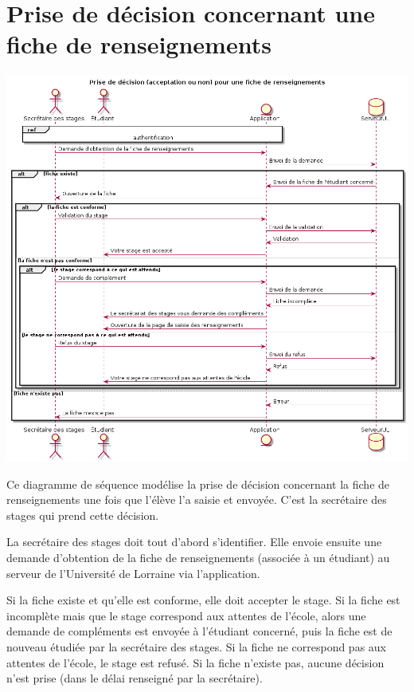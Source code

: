 \documentclass[11pt, a4paper]{report}
\begin{document}
\section*{Prise de décision concernant une fiche de renseignements}
\centerline{\includegraphics[scale=0.5]{Images/prisededecisionfichederenseignements.png}}
\hspace{1cm}Ce diagramme de séquence modélise la prise de décision concernant la fiche de renseignements une fois que l’élève l’a saisie et envoyée. C’est la secrétaire des stages qui prend cette décision.\vspace{0.2cm}

\hspace{0.6cm}La secrétaire des stages doit tout d’abord s’identifier. Elle envoie ensuite une demande d’obtention de la fiche de renseignements (associée à un étudiant) au serveur de l’Université de Lorraine via l’application. \vspace{0.2cm}

\hspace{0.6cm}Si la fiche existe et qu’elle est conforme, elle doit accepter le stage. Si la fiche est incomplète mais que le stage correspond aux attentes de l’école, alors une demande de compléments est envoyée à l’étudiant concerné, puis la fiche est de nouveau étudiée par la secrétaire des stages. Si la fiche ne correspond pas aux attentes de l’école, le stage est refusé. Si la fiche n’existe pas, aucune décision n’est prise (dans le délai renseigné par la secrétaire). \vspace{0.2cm}
\end{document}
